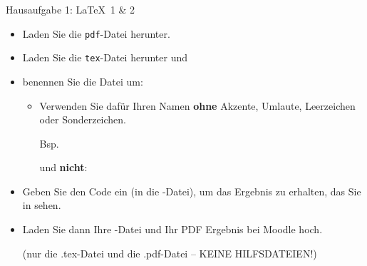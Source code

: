 \begin{frame}{Hausaufgabe 1: \LaTeX\ 1 \& 2}

\begin{itemize}
		
	\item Laden Sie die \texttt{pdf}-Datei  herunter.
	
	\item Laden Sie die \texttt{tex}-Datei  herunter und
	
	\item benennen Sie die Datei  um:
	
	\begin{itemize}
		\item Verwenden Sie dafür Ihren Namen \textbf{ohne} Akzente, Umlaute, Leerzeichen oder Sonderzeichen.
		
		Bsp.\  
		
		und \textbf{nicht}: 
		
	\end{itemize}
	
	\item Geben Sie den Code ein (in die -Datei), um das Ergebnis zu erhalten, das Sie in  sehen.
	
	\item Laden Sie dann Ihre -Datei und Ihr PDF Ergebnis  bei Moodle hoch. 
	
	(nur die \alert{.tex-Datei} und die \alert{.pdf-Datei} -- KEINE HILFSDATEIEN!)
\end{itemize}

\end{frame}


%
%
%


%	
%	
%	
%
%
%
